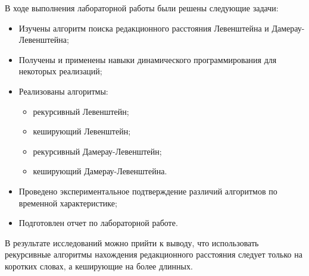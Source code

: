 
В ходе выполнения лабораторной работы были решены следующие задачи:

\begin{itemize}
	\item Изучены алгоритм поиска редакционного расстояния Левенштейна и Дамерау-Левенштейна;
	\item Получены и применены навыки динамического программирования для некоторых реализаций;
	\item Реализованы алгоритмы:
	\begin{itemize}
		\item рекурсивный Левенштейн;
		\item кеширующий Левенштейн;
		\item рекурсивный Дамерау-Левенштейн;
		\item кеширующий Дамерау-Левенштейна.
	\end{itemize}
	\item Проведено экспериментальное подтверждение различий алгоритмов по временной характеристике;
	\item Подготовлен отчет по лабораторной работе.
\end{itemize}

В результате исследований можно прийти к выводу, что использовать рекурсивные алгоритмы нахождения редакционного расстояния следует только на коротких словах, а кеширующие на более длинных.